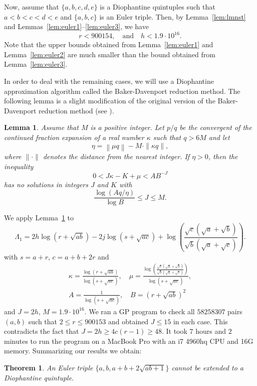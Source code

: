 \documentclass{amsart}
\newtheorem{theorem}{Theorem}
\newtheorem{lemma}{Lemma}
\theoremstyle{definition}
\begin{document}
Now, assume that $\{a,b,c,d,e\}$ is a Diophantine quintuples such that $a<b<c<d<e$ and $\{a,b,c\}$ is an Euler triple. Then, by Lemma~\ref{lem:lmnst} and Lemmas~\ref{lem:euler1}--\ref{lem:euler3}, we have 
$$
r<900154,\quad \text{and} \quad h<1.9\cdot 10^{16}. 
$$
Note that the upper bounds obtained from Lemma~\ref{lem:euler1} and Lemma~\ref{lem:euler2} are much smaller than the bound obtained from Lemma~\ref{lem:euler3}.

In order to deal with the remaining cases, we
will use a Diophantine approximation algorithm called the
Baker-Davenport reduction method. The following lemma is a slight
modification of the original version of the Baker-Davenport reduction
method (see \cite[Lemma 5a]{Dujella-Pethoe:1998}).

\begin{lemma}\label{lem:Baker-Davenport}
Assume that $M$ is a positive integer. Let $p/q$ be the convergent
of the continued fraction expansion of a real number $\kappa$ such that $q > 6M$ and let
$$\eta=\left\| \mu q \right\| - M \cdot \| \kappa q\|,$$
where $\parallel\cdot\parallel$ denotes the distance from the
nearest integer. If $\eta > 0$, then the
inequality
$$0 < J\kappa -K+\mu < AB^{-J}$$
has no solutions in integers $J$ and $K$ with
$$
\frac{\log\left(Aq/\eta\right)}{\log B}\leq J \leq M.
$$
\end{lemma}

We apply Lemma~\ref{lem:Baker-Davenport} to 
$$
\Lambda_1 = 2h \log(r+\sqrt{ab})- 2j \log(s+\sqrt{ac}) + \log \left(\frac{\sqrt{c}(\sqrt{a}+\sqrt{b})}{\sqrt{b}(\sqrt{a}+\sqrt{c})}\right).
$$
with $s=a+r$, $c=a+b+2r$ and
\begin{gather*}
\kappa=\frac{\log(r+\sqrt{ab})}{\log(s+\sqrt{ac})},\quad
\mu=\frac{\log \left(\frac{\sqrt{c}(\sqrt{a}+\sqrt{b})}{\sqrt{b}(\sqrt{a}+\sqrt{c})}\right)}{\log (s+\sqrt{ac})},\\
 A=\frac{1}{\log(s+\sqrt{ac})},\quad B=(r+\sqrt{ab})^2
\end{gather*}
and $J= 2h$, $M =1.9\cdot 10^{16}$. 
We ran a GP program to check all $58258307$ pairs $(a,b)$ such that $2\le r\le 900153$ and obtained $J\le15$ in each case.
This contradicts the fact that $J=2h\ge 4c(r-1)\ge 48$. It took $7$ hours and $2$ minutes to run the program on a MacBook Pro 
with an i7 4960hq CPU and 16G memory. Summarizing our results we obtain:

\begin{theorem}\label{thm:euler}
An Euler triple $\{a,b,a+b+2\sqrt{ab+1}\}$ cannot be extended to a Diophantine quintuple.
\end{theorem}
\end{document}
